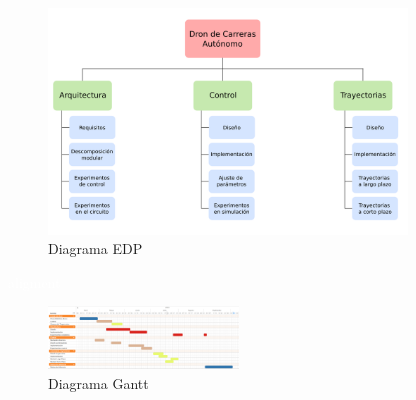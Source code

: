 \begin{figure}[htb!]
	\centering
	\includegraphics[width=0.85\textwidth]{imagenes/EDP}
	\caption{Diagrama EDP}
	\label{edp}
\end{figure}

\newpage

\textcolor{white}{aligment}
\begin{figure}[htb!]
	\centering
	\includegraphics[angle=90,width =0.45\textwidth]{imagenes/gantt}
	\caption{Diagrama Gantt}
	\label{gantt}
\end{figure}

